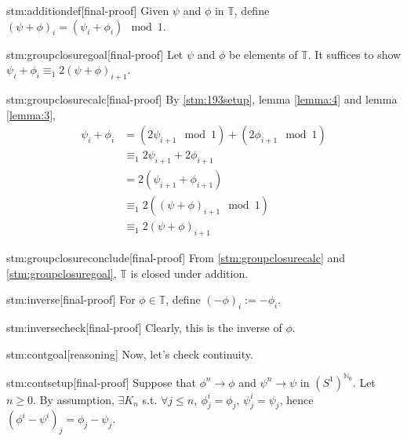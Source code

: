 \documentclass{article}
\begin{document}
\begin{stm}{stm:additiondef}[final-proof]
Given $\psi$ and $\phi$ in $\mathbb{T}$, define $(\psi + \phi)_i = (\psi_i + \phi_i) \mod 1$.
\end{stm}

\begin{stm}{stm:groupclosuregoal}[final-proof]
Let $\psi$ and $\phi$ be elements of $\mathbb{T}$. It suffices to show $\psi_i + \phi_i \equiv_1 2(\psi + \phi)_{i+1}$.
\end{stm}

\begin{stm}{stm:groupclosurecalc}[final-proof]
By \ref{stm:193setup}, lemma \ref{lemma:4} and lemma \ref{lemma:3},
\begin{align*}
\psi_i + \phi_i &= (2\psi_{i+1} \mod 1) + (2\phi_{i+1} \mod 1) \\
&\equiv_1 2\psi_{i+1} + 2\phi_{i+1} \\
&= 2(\psi_{i+1} + \phi_{i+1}) \\
&\equiv_1 2((\psi + \phi)_{i+1} \mod 1) \\
&\equiv_1 2(\psi + \phi)_{i+1}
\end{align*}
\end{stm}

\begin{stm}{stm:groupclosureconclude}[final-proof]
From \ref{stm:groupclosurecalc} and \ref{stm:groupclosuregoal}, $\mathbb{T}$ is closed under addition.
\end{stm}

\begin{stm}{stm:inverse}[final-proof]
For $\phi \in \mathbb{T}$, define $(-\phi)_i := -\phi_i$.
\end{stm}

\begin{stm}{stm:inversecheck}[final-proof]
Clearly, this is the inverse of $\phi$.
\end{stm}

\begin{stm}{stm:contgoal}[reasoning]
Now, let's check continuity.
\end{stm}

\begin{stm}{stm:contsetup}[final-proof]
Suppose that $\phi^n \to \phi$ and $\psi^n \to \psi$ in $(S^1)^{\mathbb{N}_0}$. Let $n \ge 0$. By assumption, $\exists K_n$ s.t. $\forall j \le n, \ \phi_j^i = \phi_j$, $\psi_j^i = \psi_j$, hence $(\phi^i - \psi^i)_j = \phi_j - \psi_j$.
\end{stm}
\end{document}
